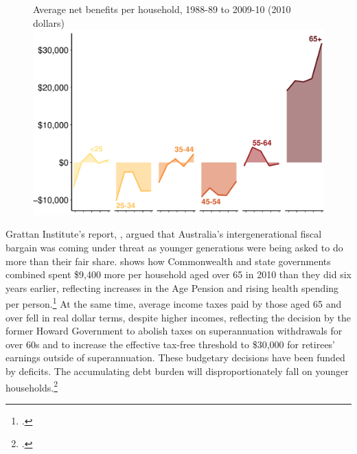 \begin{figure}[p]
%
{Average net benefits per household, 1988-89 to 2009-10 (2010 dollars)}\label{fig:SUPER-Wealth-of-generations-chart}
\includegraphics[width=\columnwidth]{super-atlas/Figure1-helvet-1.pdf}

\end{figure}

Grattan Institute’s report, , argued that Australia’s intergenerational fiscal bargain was coming under threat as younger generations were being asked to do more than their fair share.  shows how Commonwealth and state governments combined spent \$9,400 more per household aged over 65 in 2010 than they did six years earlier, reflecting increases in the Age Pension and rising health spending per person.\footcite[][22]{DaleyWoodWeidmannEtAl2014}  At the same time, average income taxes paid by those aged 65 and over fell in real dollar terms, despite higher incomes, reflecting the decision by the former Howard Government to abolish taxes on superannuation withdrawals for over 60s and to increase the effective tax-free threshold to \$30,000 for retirees’ earnings outside of superannuation. These budgetary decisions have been funded by deficits. The accumulating debt burden will disproportionately fall on younger households.\footcite[][29]{DaleyWoodWeidmannEtAl2014}


